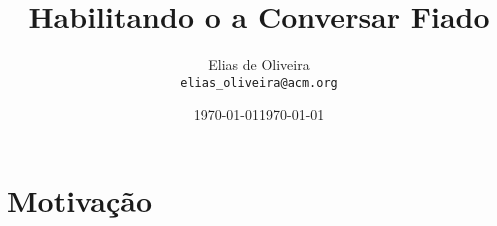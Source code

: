 \documentclass[12pt,a4paper,portuguese]{article}
\title{Habilitando o {\rava} a Conversar Fiado}
\author{Elias de Oliveira\\
        {\tt elias\_oliveira@acm.org}}
\date{\today}
\begin{document}
\date{\today}
\pagestyle{empty}
\maketitle

\section{Motivação}
\label{introducao}




\end{document}
